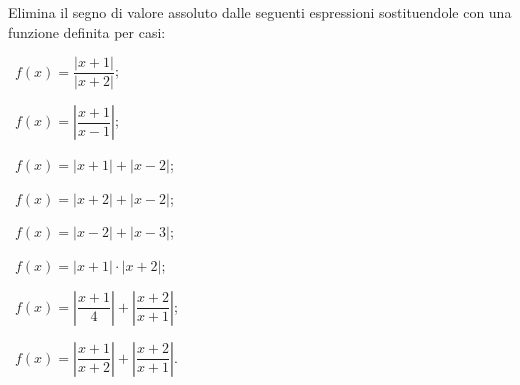 \begin{esercizio}
\label{ese:1.11}
 Elimina il segno di valore assoluto dalle seguenti espressioni sostituendole con una funzione definita per casi:
 \begin{multicols}{2}
 \begin{enumeratea}
 \item~$f(x)=\dfrac{\left|x+1\right|}{\left|x+2\right|}$;
 \item~$f(x)=\left|\dfrac{x+1}{x-1}\right|$;
 \item~$f(x)=\left|x+1\right|+\left|x-2\right|$;
 \item~$f(x)=\left|x+2\right|+\left|x-2\right|$;
 \item~$f(x)=\left|x-2\right|+\left|x-3\right|$;
 \item~$f(x)=\left|x+1\right|\cdot \left|x+2\right|$;
 \item~$f(x)=\left|\dfrac{x+1} 4\right|+\left|\dfrac{x+2}{x+1}\right|$;
 \item~$f(x)=\left|\dfrac{x+1}{x+2}\right|+\left|\dfrac{x+2}{x+1}\right|$.
 \end{enumeratea}
 \end{multicols}
\end{esercizio}

